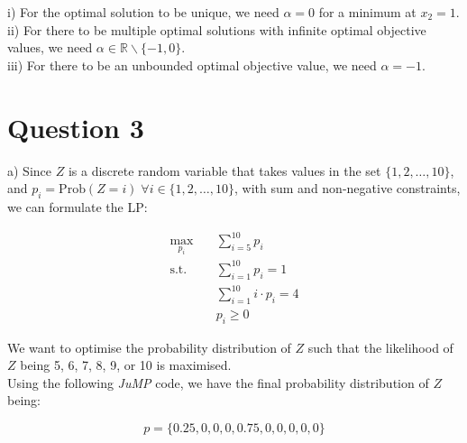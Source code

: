 \documentclass[12pt]{article}
\begin{document}
\noindent i) For the optimal solution to be unique, we need $\alpha = 0$ for a minimum at $x_{2} = 1$. \\ 

\noindent ii) For there to be multiple optimal solutions with infinite optimal objective values, we need $\alpha \in \mathbb{R} \backslash \{-1,0\}$. \\ 

\noindent iii) For there to be an unbounded optimal objective value, we need $\alpha = -1$. 

\newpage 

\section*{Question 3}
a) Since $Z$ is a discrete random variable that takes values in the set $\{1, 2, \dots, 10\}$, and $p_i = \text{Prob}(Z = i) \; \forall i \in \{1, 2, \dots , 10\}$, with sum and non-negative constraints, we can formulate the LP: 

\begin{align*}
    \max_{p_i} \quad & \sum_{i=5}^{10} p_i \\ 
    \text{s.t.} \quad & \sum_{i=1}^{10} p_i = 1 \\ 
    & \sum_{i=1}^{10} i \cdot p_i = 4 \\ 
    & p_i \geq 0
\end{align*}

\noindent We want to optimise the probability distribution of $Z$ such that the likelihood of $Z$ being 5, 6, 7, 8, 9, or 10 is maximised. \\ 

\noindent Using the following \textit{JuMP} code, we have the final probability distribution of $Z$ being: 

\begin{equation*}
    \boxed{p = \{0.25, 0, 0, 0, 0.75, 0, 0, 0, 0, 0\}}
\end{equation*}

    
    
    
    
    
\end{document}
